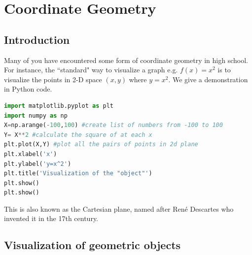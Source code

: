 \chapter{Coordinate Geometry}
\setcounter{exercisecounter}{0}

\setcounter{thmcounter}{1}
\section{Introduction}
Many of you have encountered some form of coordinate geometry in high school. For instance, the ``standard" way to visualize a graph e.g. $f(x)=x^2$ is to visualize the points in 2-D space $(x,y)$ where $y=x^2$. We give a demonstration in Python code.

\begin{lstlisting}[language=Python]
import matplotlib.pyplot as plt
import numpy as np
X=np.arange(-100,100) #create list of numbers from -100 to 100
Y= X**2 #calculate the square of at each x
plt.plot(X,Y) #plot all the pairs of points in 2d plane
plt.xlabel('x')
plt.ylabel('y=x^2')
plt.title('Visualization of the "object"')
plt.show()
plt.show()
\end{lstlisting}


This is also known as the Cartesian plane, named after René Descartes who invented it in the 17th century.\\
\section{Visualization of geometric objects}

